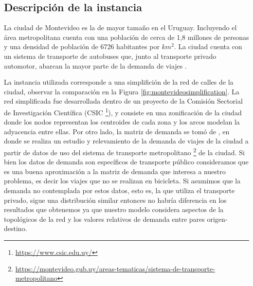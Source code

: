 \subsection{Descripción de la instancia}

La ciudad de Montevideo es la de mayor tamaño en el Uruguay. Incluyendo el área metropolitana cuenta con una población de cerca de 1,8 millones de personas y una densidad de población de 6726 habitantes por $km^2$. La ciudad cuenta con un sistema de transporte de autobuses que, junto al transporte privado automotor, abarcan la mayor parte de la demanda de viajes \parencite{Mauttone2017a}.

La instancia utilizada corresponde a una simplifición de la red de calles de la ciudad, observar la comparación en la Figura \ref{fig:montevideosimplification}. La red simplificada fue desarrollada dentro de un proyecto de la Comisión Sectorial de Investigación Científica (CSIC \footnote{\url{https://www.csic.edu.uy/}}), y consiste en una zonificación de la ciudad donde los nodos representan los centroides de cada zona y los arcos modelan la adyacencia entre ellas. Por otro lado, la matriz de demanda se tomó de \textcite{Massobrio2020}, en donde se realiza un estudio y relevamiento de la demanda de viajes de la ciudad a partir de datos de uso del sistema de transporte metropolitano \footnote{\url{https://montevideo.gub.uy/areas-tematicas/sistema-de-transporte-metropolitano}} de la ciudad. Si bien los datos de demanda son específicos de transporte público consideramos que es una buena aproximación a la matriz de demanda que interesa a nuestro problema, es decir los viajes que no se realizan en bicicleta. Si asumimos que la demanda no contemplada por estos datos, esto es, la que utiliza el transporte privado, sigue una distribución similar entonces no habría diferencia en los resultados que obtenemos ya que nuestro modelo considera aspectos de la topológicos de la red y los valores relativos de demanda entre pares origen-destino.

